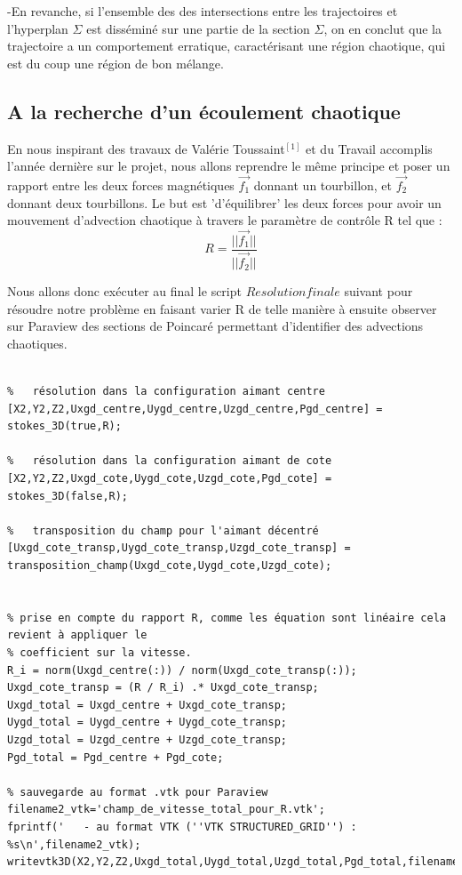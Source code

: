 \documentclass[a4paper,12pt,titlepage]{report}
\begin{document}
\begin{onehalfspace}
-En revanche, si l'ensemble des des intersections entre les trajectoires et l'hyperplan $\Sigma$ est disséminé sur une partie de la section $\Sigma$, on en conclut que la trajectoire a un comportement erratique, caractérisant une région chaotique, qui est du coup une région de bon mélange. 

\subsection{A la recherche d'un écoulement chaotique}

En nous inspirant des travaux de Valérie Toussaint$^{[1]}$ et du Travail accomplis l'année dernière sur le projet, nous allons reprendre le même principe et poser un rapport entre les deux forces magnétiques $\vec{f_1}$ donnant un tourbillon, et $\vec{f_2}$ donnant deux tourbillons. Le but est 'd'équilibrer' les deux forces pour avoir un mouvement d'advection chaotique à travers le paramètre de contrôle R tel que :
\[ R = \frac{||\vec{f_1}||}{||\vec{f_2}||} \]

Nous allons donc exécuter au final le script $Resolution finale$ suivant pour résoudre notre problème en faisant varier R de telle manière à ensuite observer sur Paraview des sections de Poincaré permettant d'identifier des advections chaotiques.

\begin{verbatim}

%   résolution dans la configuration aimant centre
[X2,Y2,Z2,Uxgd_centre,Uygd_centre,Uzgd_centre,Pgd_centre] = stokes_3D(true,R);

%   résolution dans la configuration aimant de cote
[X2,Y2,Z2,Uxgd_cote,Uygd_cote,Uzgd_cote,Pgd_cote] = stokes_3D(false,R);

%   transposition du champ pour l'aimant décentré
[Uxgd_cote_transp,Uygd_cote_transp,Uzgd_cote_transp] = transposition_champ(Uxgd_cote,Uygd_cote,Uzgd_cote);


% prise en compte du rapport R, comme les équation sont linéaire cela revient à appliquer le 
% coefficient sur la vitesse.
R_i = norm(Uxgd_centre(:)) / norm(Uxgd_cote_transp(:));
Uxgd_cote_transp = (R / R_i) .* Uxgd_cote_transp;
Uxgd_total = Uxgd_centre + Uxgd_cote_transp;
Uygd_total = Uygd_centre + Uygd_cote_transp;
Uzgd_total = Uzgd_centre + Uzgd_cote_transp;
Pgd_total = Pgd_centre + Pgd_cote;

% sauvegarde au format .vtk pour Paraview
filename2_vtk='champ_de_vitesse_total_pour_R.vtk';
fprintf('   - au format VTK (''VTK STRUCTURED_GRID'') : %s\n',filename2_vtk);
writevtk3D(X2,Y2,Z2,Uxgd_total,Uygd_total,Uzgd_total,Pgd_total,filename2_vtk);
\end{verbatim}


\end{onehalfspace}
\end{document}
